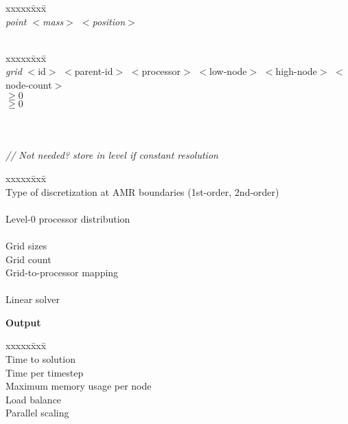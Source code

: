 \documentclass[11pt]{article}
\begin{document}
\begin{tabbing}
xxxxx\=xxx\=\kill\\ 
\> \done \textit{point $<$mass$>$ $<$position$>$} \\
\>\>  \\
\>\> 
\end{tabbing}

\begin{tabbing}
xxxxx\=xxx\=\kill\\ 
\> \textit{grid} $<$id$>$ $<$parent-id$>$ $<$processor$>$ $<$low-node$>$ $<$high-node$>$ $<$node-count$>$ \\
\> \>  $\ge 0$ \\
\> \>  $\ge 0$  \\
\> \>  \\
\> \> \code{[3]} \\
\> \> \code{[3]} \\
\> \> \code{[3]} \textit{// Not needed? store in level if constant resolution}
\end{tabbing}

\begin{tabbing}
xxxxx\=xxx\=\kill\\ 
\> \todo \>   Type of discretization at AMR boundaries (1st-order, 2nd-order) \\
 \\
\> \todo \>    Level-0 processor distribution \\
 \\
\> \todo \>    Grid sizes \\
\> \todo \>    Grid count \\
\> \todo \>    Grid-to-processor mapping \\
 \\
\> \todo \>    Linear solver \\
\end{tabbing}

\textbf{Output}

\begin{tabbing}
xxxxx\=xxx\=\kill\\ 
\> \todo \>    Time to solution \\
\> \todo \>    Time per timestep \\
\> \todo \>    Maximum memory usage per node \\
\> \todo \>    Load balance \\
\> \todo \>    Parallel scaling \\
\end{tabbing}
\end{document}
